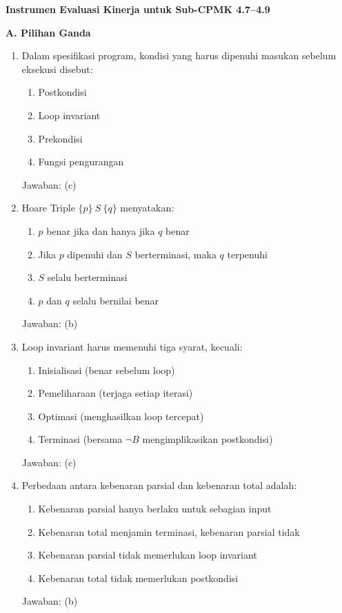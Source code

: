 \documentclass[../main]{subfiles}
\begin{document}
\begin{asesmen}
\textbf{Instrumen Evaluasi Kinerja untuk Sub-CPMK 4.7--4.9}

\textbf{A. Pilihan Ganda}
\begin{enumerate}
  \item Dalam spesifikasi program, kondisi yang harus dipenuhi masukan sebelum eksekusi disebut:
  \begin{enumerate}
    \item Postkondisi
    \item Loop invariant
    \item Prekondisi
    \item Fungsi pengurangan
  \end{enumerate}
  Jawaban: (c)

  \item Hoare Triple $\{p\}\ S\ \{q\}$ menyatakan:
  \begin{enumerate}
    \item $p$ benar jika dan hanya jika $q$ benar
    \item Jika $p$ dipenuhi dan $S$ berterminasi, maka $q$ terpenuhi
    \item $S$ selalu berterminasi
    \item $p$ dan $q$ selalu bernilai benar
  \end{enumerate}
  Jawaban: (b)

  \item Loop invariant harus memenuhi tiga syarat, kecuali:
  \begin{enumerate}
    \item Inisialisasi (benar sebelum loop)
    \item Pemeliharaan (terjaga setiap iterasi)
    \item Optimasi (menghasilkan loop tercepat)
    \item Terminasi (bersama $\neg B$ mengimplikasikan postkondisi)
  \end{enumerate}
  Jawaban: (c)

  \item Perbedaan antara kebenaran parsial dan kebenaran total adalah:
  \begin{enumerate}
    \item Kebenaran parsial hanya berlaku untuk sebagian input
    \item Kebenaran total menjamin terminasi, kebenaran parsial tidak
    \item Kebenaran parsial tidak memerlukan loop invariant
    \item Kebenaran total tidak memerlukan postkondisi
  \end{enumerate}
  Jawaban: (b)


\end{enumerate}
\end{asesmen}
\end{document}
